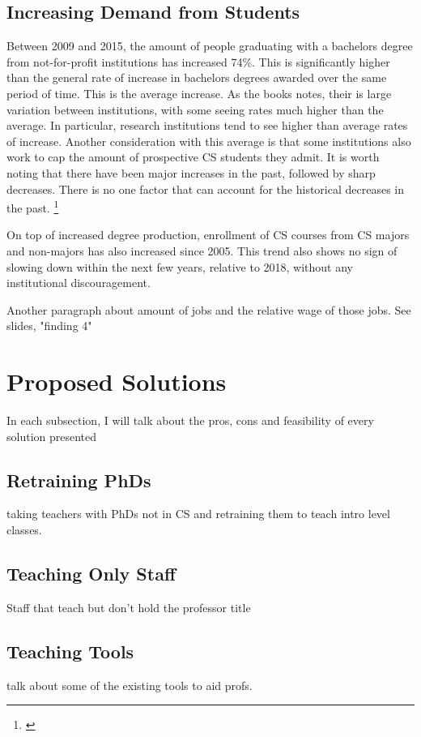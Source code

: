 \documentclass[12pt,twoside]{reedthesis}
\begin{document}
\subsection{Increasing Demand from Students}
Between 2009 and 2015, the amount of people graduating with a bachelors degree from not-for-profit institutions has increased 74\%. This is significantly higher than the general rate of increase in bachelors degrees awarded over the same period of time. This is the average increase. As the books notes, their is large variation between institutions, with some seeing rates much higher than the average. In particular, research institutions tend to see higher than average rates of increase. Another consideration with this average is that some institutions also work to cap the amount of prospective CS students they admit. It is worth noting that there have been major increases in the past, followed by sharp decreases. There is no one factor that can account for the historical decreases in the past.  \footnote{\cite{committee_on_the_growth_of_computer_science_undergraduate_enrollments_assessing_2018}} 

On top of increased degree production, enrollment of CS courses from CS majors and non-majors has also increased since 2005. This trend also shows no sign of slowing down within the next few years, relative to 2018, without any institutional discouragement. 

Another paragraph about amount of jobs and the relative wage of those jobs. See slides, "finding 4"

\section{Proposed Solutions}
In each subsection, I will talk about the pros, cons and feasibility of every solution presented

\subsection{Retraining PhDs}
taking teachers with PhDs not in CS and retraining them to teach intro level classes.

\subsection{Teaching Only Staff}
Staff that teach but don't hold the professor title

\subsection{Teaching Tools}
talk about some of the existing tools to aid profs.
\end{document}
